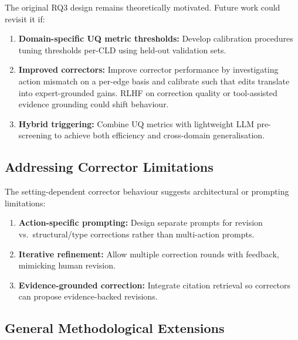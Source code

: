 The original RQ3 design remains theoretically motivated. Future work could revisit it if:
\begin{enumerate}[noitemsep]
    \item \textbf{Domain-specific UQ metric thresholds:} Develop calibration procedures tuning thresholds per-CLD using held-out validation sets.
    \item \textbf{Improved correctors:} Improve corrector performance by investigating action mismatch on a per-edge basis and calibrate such that edits translate into expert-grounded gains. RLHF on correction quality or tool-assisted evidence grounding could shift behaviour.
    \item \textbf{Hybrid triggering:} Combine UQ metrics with lightweight LLM pre-screening to achieve both efficiency and cross-domain generalisation.
\end{enumerate}

\subsection{Addressing Corrector Limitations}

The setting-dependent corrector behaviour suggests architectural or prompting limitations:
\begin{enumerate}[noitemsep]
    \item \textbf{Action-specific prompting:} Design separate prompts for revision vs.\ structural/type corrections rather than multi-action prompts.
    \item \textbf{Iterative refinement:} Allow multiple correction rounds with feedback, mimicking human revision.
    \item \textbf{Evidence-grounded correction:} Integrate citation retrieval so correctors can propose evidence-backed revisions.
\end{enumerate}

\subsection{General Methodological Extensions}

